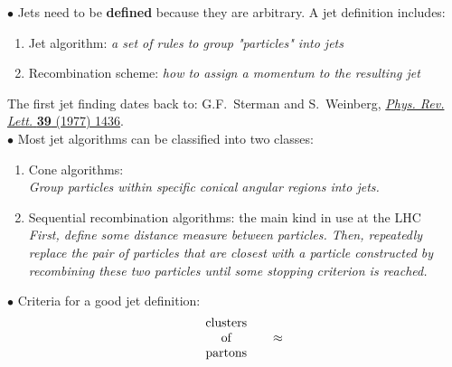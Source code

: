 \documentclass[9pt,a4paper,unknownkeysallowed,xcolor=dvipsnames,aspectratio=43]{beamer}
\begin{document}
\begin{frame}{\bf\huge {}}
\vspace{2mm}
{\color{darkred}\Large$\bullet$} Jets need to be {\bf defined} because they are arbitrary. A jet definition includes:\\
\begin{enumerate}
    \item[\diamondsuit] {Jet algorithm:} {\it a set of rules to group "particles" into jets}
    \item[\diamondsuit] {Recombination scheme:} {\it how to assign a momentum to the resulting jet}
\end{enumerate}
The first jet finding dates back to:
    {\tiny\color{teablue}G.F.~Sterman and S.~Weinberg, %
  \href{https://doi.org/10.1103/PhysRevLett.39.1436}{\emph{Phys. Rev. Lett.}
  {\bfseries 39} (1977) 1436}.}\\
\vspace{2mm}
{\color{darkred}\Large$\bullet$} Most jet algorithms can be classified into two classes:\\
\begin{enumerate}
    \item[\diamondsuit] {Cone algorithms:} \\{\it Group particles within specific conical angular regions into jets.}
    \item[\diamondsuit] {\color{darkred} Sequential recombination algorithms:} the main kind in use at the LHC\\{\it First, define some
distance measure between particles. Then, repeatedly replace the pair of particles that are closest with a particle constructed by recombining these two particles until some stopping criterion is reached.}
\end{enumerate}
\vspace{2mm}
{\color{darkred}\Large$\bullet$} Criteria for a good jet definition:\\
\begin{align}
    \begin{minipage}[c]{0.2\textwidth}
    \begin{center}
  clusters\\
  of\\
  partons
    \end{center}
\end{minipage}
\approx
\begin{minipage}[c]{0.2\textwidth}

\end{minipage}
\end{align}
\end{frame}
\end{document}
